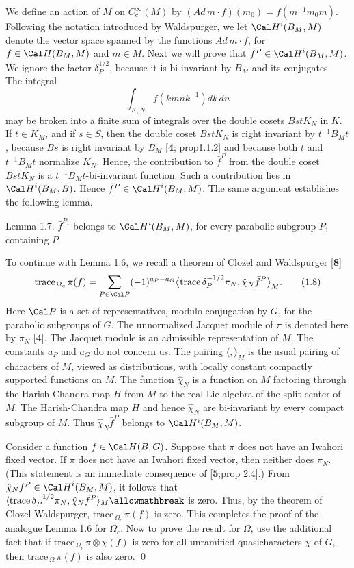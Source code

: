 We define an action
of $M$ on $C_c^\infty(M)$ by
  $ (Ad\,m \cdot f) (m_0) = f (m^{-1} m_0 m) $.
Following the notation introduced by Waldspurger, we let 
  $ {\Cal H}^i (B_M, M) $
denote the vector space spanned by the functions
  $ Ad\,m \cdot f $, for
  $ f \in {\Cal H} (B_M, M) $ and
  $ m \in M $.
Next we will prove that
  $ \bar f^P \in {\Cal H}^i (B_M, M) $.
We ignore the factor
  $ \delta_P^{1/2} $, because
it is bi-invariant by 
  $ B_M $
and its conjugates.
The integral
$$\int_{K,N} f(kmnk^{-1}) dk\,dn$$
may be broken into a finite sum of integrals over the double cosets
$BstK_N$ in $K$.   If $t\in K_M$, and if $s\in S$, then the double coset 
$BstK_N$ is right invariant by $t^{-1}B_Mt$, because $Bs$ is right
invariant by $B_M$  [{\bf 4}; prop\. 1.1.2] 
and because both $t$ and $t^{-1}B_Mt$ normalize $K_N$.
Hence, the contribution to $\bar f^P$ from the double coset $BstK_N$
is a $t^{-1}B_Mt$-bi-invariant function.  Such a contribution
lies in ${\Cal H}^i(B_M,B)$.  Hence $\bar f^P\in {\Cal H}^i(B_M,M)$.
The same argument establishes the following lemma.

\proclaim Lemma {1.7}. $\bar f^{P_1}$ belongs to ${\Cal H}^i(B_M,M)$, for
every parabolic subgroup $P_1$ containing $P$.
\finishproclaim

To continue with Lemma 1.6, we recall
a theorem of Clozel and Waldspurger [{\bf 8}]
%
$$
  \text{trace}_{\,\Omega_c} \, \pi (f) =
  \sum_{P \in {\Cal P}}
  (-1)^{a_P-a_G}
  \big\langle
    \text{trace}\, \delta_P^{-1/2} 
    \pi_N, 
    \hat \chi_N
    \bar f^P 
  \big\rangle_M.
\tag{1.8}
$$
%
Here
  $ {\Cal P} $
is a set of representatives, modulo conjugation by $G$, for
the parabolic subgroups of $G$.
The unnormalized Jacquet module of
  $ \pi $ is denoted here by $\pi_N$ 
[{\bf 4}]. The Jacquet module
is an admissible representation of $M$.
The constants
  $ a_P $
and
  $ a_G $
do not concern us.
The pairing
  $ \langle , \rangle _M $
is the usual pairing of characters of $M$,
viewed as distributions, with locally constant compactly
  supported functions on $M$.
  The function
  $ \hat {\chi}_N $
is a function on $M$ factoring through the Harish-Chandra
  map $H$ from $M$ to the
real Lie algebra of the split center of $M$.
The Harish-Chandra map $H$ and hence 
  $ \hat {\chi}_N $ 
are bi-invariant by every compact subgroup of $M$.
Thus
  $ \hat {\chi}_N \bar f^P$ belongs to  $\Cal H^i(B_M, M) $.

Consider a function
  $ f \in {\Cal H} (B,G) $.
Suppose that 
  $ \pi $
does not have an Iwahori fixed vector.
If 
  $ \pi $
does not have an Iwahori fixed vector, then neither does
  $ \pi_N $.
(This statement is an immediate consequence of [{\bf 5};prop 2.4].)
From
  $ \hat {\chi}_N \bar f^P \in {\Cal H}^i
    (B_M,M) $,
it follows that
  $ \langle
      \text{trace} \, \delta_P^{-1/2}
      \pi_N,
      \hat \chi_N
      \bar f^P
    \rangle_M \allowmathbreak$ is zero.
Thus, by the theorem of Clozel-Waldspurger,
$
  \text{trace}_{\,\Omega_c}\, \pi (f)
$ is zero.
%
This completes the proof of the analogue Lemma 1.6 for $\Omega_c$.
Now to prove the result for $\Omega$, use the additional fact
that if $\text{trace}_{\,\Omega_c}\,\pi\otimes\chi(f)$ is zero for all
unramified quasicharacters $\chi$ of $G$, then 
$\text{trace}_{\,\Omega}\,\pi(f)$ is also zero.
\qed
\finishpproclaim

